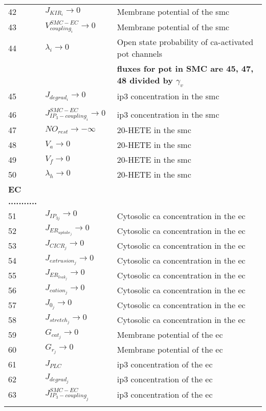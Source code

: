 \documentclass[]{article}
\newcommand{\pot}{\gls{pot}\xspace}
\newcommand{\ca}{\gls{ca}\xspace}
\newcommand{\ip}{\gls{ip3}\xspace}
\begin{document}
\begin{longtable}[h!] { p{0.12\linewidth}  p{0.28\linewidth}     p{0.6\linewidth} }
42 &    $ J_{KIR_{i}} \rightarrow 0$ & Membrane potential of the \gls{smc}\\
43 &    $V^{SMC-EC}_{coupling_{i}} \rightarrow 0$ &  Membrane potential of the \gls{smc}\\
44 &    $\lambda_{i}   \rightarrow 0$ &  Open state probability of \ca-activated \pot channels \\
 &   &  \textbf{fluxes for \pot in SMC are 45, 47, 48 divided by $\gamma_v$} \\
45 &    $ J_{degrad_{i}}\rightarrow 0$ & \ip concentration in the \gls{smc}\\
 &   &  \\
46 &    $ J^{SMC-EC}_{IP_{3}-coupling_{i}}\rightarrow 0$ & \ip concentration in the \gls{smc}\\
47 & $NO_{rest} \rightarrow -\infty $ & 20-HETE in the \gls{smc} \\
48 & $V_a \rightarrow 0$ & 20-HETE in the \gls{smc} \\
49 &    $ V_f\rightarrow 0$ &  20-HETE in the \gls{smc}\\
50 &    $ \lambda_h\rightarrow 0$ & 20-HETE in the \gls{smc} \\
 \textbf{EC ...........}   &  & \\
 51 &    $ J_{IP_{3j}}\rightarrow 0$ & Cytosolic \ca concentration in the \gls{ec} \\
 52 &    $ J_{ER_{uptake_{j}}}\rightarrow 0 $ &  Cytosolic \ca concentration in the \gls{ec}\\
 53 &    $J_{CICR_{j}} \rightarrow 0$ &Cytosolic \ca concentration in the \gls{ec} \\
 54 &    $ J_{extrusion_{j}} \rightarrow 0$ & Cytosolic \ca concentration in the \gls{ec}\\
 55 &    $J_{ER_{leak_{j}}} \rightarrow 0$ &Cytosolic \ca concentration in the \gls{ec} \\
 56 &    $ J_{cation_{j}}\rightarrow 0$ & Cytosolic \ca concentration in the \gls{ec}\\
 57 &    $ J_{0_{j}}\rightarrow 0$ & Cytosolic \ca concentration in the \gls{ec}\\
 58 &    $ J_{stretch_{j}} \rightarrow 0$ &Cytosolic \ca concentration in the \gls{ec} \\
 59 & $G_{cat_j} \rightarrow 0$ &Membrane potential of the \gls{ec} \\
 60 & $ G_{r_j} \rightarrow 0 $ &Membrane potential of the \gls{ec} \\
 61 &    $ J_{PLC}$ &\ip concentration of the \gls{ec} \\
 62 &    $ J_{degrad_{j}}  $ &\ip concentration of the \gls{ec} \\
 63 &    $ J^{SMC-EC}_{IP_{3}-coupling_{j}}$ & \ip concentration of the \gls{ec}\\
	\hline
	\label{tab:table1}
\end{longtable}
\end{document}
